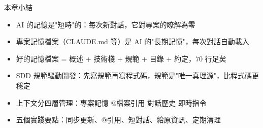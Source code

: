 \begin{tcbsummary}{本章小結}
\begin{itemize}
  \item AI 的記憶是"短時"的：每次新對話，它對專案的瞭解為零
  \item 專案記憶檔案（CLAUDE.md 等）是 AI 的"長期記憶"，每次對話自動載入
  \item 好的記憶檔案 = 概述 + 技術棧 + 規範 + 目錄 + 約定，70 行足矣
  \item SDD 規範驅動開發：先寫規範再寫程式碼，規範是"唯一真理源"，比程式碼更穩定
  \item 上下文分四層管理：專案記憶 @檔案引用 對話歷史 即時指令
  \item 五個實踐要點：同步更新、@引用、短對話、給原資訊、定期清理
\end{itemize}

\end{tcbsummary}
